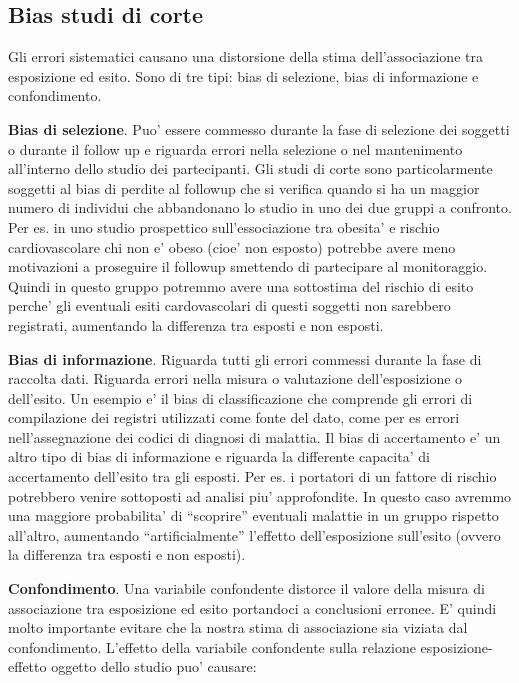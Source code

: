 \documentclass[]{book}
\begin{document}
\hypertarget{bias-studi-di-corte}{%
\subsection{Bias studi di corte}\label{bias-studi-di-corte}}

Gli errori sistematici causano una distorsione della stima dell'associazione tra esposizione ed esito. Sono di tre tipi: bias di selezione, bias di informazione e confondimento.

\textbf{Bias di selezione}. Puo' essere commesso durante la fase di selezione dei soggetti o durante il follow up e riguarda errori nella selezione o nel mantenimento all'interno dello studio dei partecipanti. Gli studi di corte sono particolarmente soggetti al bias di perdite al followup che si verifica quando si ha un maggior numero di individui che abbandonano lo studio in uno dei due gruppi a confronto. Per es. in uno studio prospettico sull'essociazione tra obesita' e rischio cardiovascolare chi non e' obeso (cioe' non esposto) potrebbe avere meno motivazioni a proseguire il followup smettendo di partecipare al monitoraggio. Quindi in questo gruppo potremmo avere una sottostima del rischio di esito perche' gli eventuali esiti cardovascolari di questi soggetti non sarebbero registrati, aumentando la differenza tra esposti e non esposti.

\textbf{Bias di informazione}. Riguarda tutti gli errori commessi durante la fase di raccolta dati. Riguarda errori nella misura o valutazione dell'esposizione o dell'esito. Un esempio e' il bias di classificazione che comprende gli errori di compilazione dei registri utilizzati come fonte del dato, come per es errori nell'assegnazione dei codici di diagnosi di malattia.
Il bias di accertamento e' un altro tipo di bias di informazione e riguarda la differente capacita' di accertamento dell'esito tra gli esposti. Per es. i portatori di un fattore di rischio potrebbero venire sottoposti ad analisi piu' approfondite. In questo caso avremmo una maggiore probabilita' di ``scoprire'' eventuali malattie in un gruppo rispetto all'altro, aumentando ``artificialmente'' l'effetto dell'esposizione sull'esito (ovvero la differenza tra esposti e non esposti).

\textbf{Confondimento}. Una variabile confondente distorce il valore della misura di associazione tra esposizione ed esito portandoci a conclusioni erronee. E' quindi molto importante evitare che la nostra stima di associazione sia viziata dal confondimento. L'effetto della variabile confondente sulla relazione esposizione-effetto oggetto dello studio puo' causare:
\end{document}
